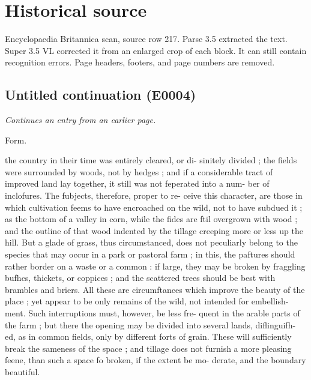 \documentclass{article}
\begin{document}
\section*{Historical source}
Encyclopaedia Britannica scan, source row 217. Parse 3.5 extracted the text. Super 3.5 VL corrected it from an enlarged crop of each block. It can still contain recognition errors.
Page headers, footers, and page numbers are removed.

\subsection*{Untitled continuation (E0004)}
\textit{Continues an entry from an earlier page.}

Form.

the country in their time was entirely cleared, or di-
sinitely divided ; the fields were surrounded by woods,
not by hedges ; and if a considerable tract of improved
land lay together, it still was not feperated into a num-
ber of inclofures. The fubjects, therefore, proper to re-
ceive this character, are those in which cultivation feems
to have encroached on the wild, not to have subdued
it ; as the bottom of a valley in corn, while the fides
are ftil overgrown with wood ; and the outline of that
wood indented by the tillage creeping more or less up
the hill. But a glade of grass, thus circumstanced,
does not peculiarly belong to the species that may
occur in a park or pastoral farm ; in this, the paftures
should rather border on a waste or a common : if large,
they may be broken by fraggling bufhcs, thickets, or
coppices ; and the scattered trees should be best with
brambles and briers. All these are circumftances
which improve the beauty of the place ; yet appear to
be only remains of the wild, not intended for embellish-
ment. Such interruptions must, however, be less fre-
quent in the arable parts of the farm ; but there the
opening may be divided into several lands, diflinguifh-
ed, as in common fields, only by different forts of
grain. These will sufficiently break the sameness of
the space ; and tillage does not furnish a more pleasing
feene, than such a space fo broken, if the extent be mo-
derate, and the boundary beautiful.
\end{document}
